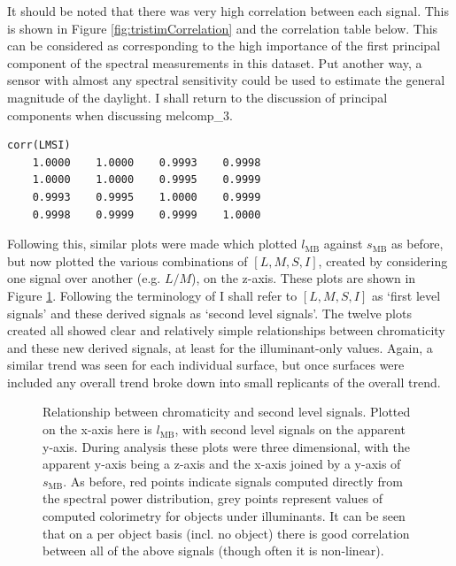 It should be noted that there was very high correlation between each signal. This is shown in Figure \ref{fig:tristimCorrelation} and the correlation table below. This can be considered as corresponding to the high importance of the first principal component of the spectral measurements in this dataset. Put another way, a sensor with almost any spectral sensitivity could be used to estimate the general magnitude of the daylight. I shall return to the discussion of principal components when discussing melcomp\_3.

\begin{minipage}{\linewidth}
\begin{lstlisting}
corr(LMSI)
    1.0000    1.0000    0.9993    0.9998
    1.0000    1.0000    0.9995    0.9999
    0.9993    0.9995    1.0000    0.9999
    0.9998    0.9999    0.9999    1.0000
\end{lstlisting}
\end{minipage}

\bigskip

Following this, similar plots were made which plotted $l_{\text{MB}}$ against $s_{\text{MB}}$ as before, but now plotted the various combinations of $[L,M,S,I]$, created by considering one signal over another (e.g. $L/M$), on the z-axis. These plots are shown in Figure \ref{fig:allComboSignals}. Following the terminology of \citet{barrionuevo_contributions_2014} I shall refer to $[L,M,S,I]$ as `first level signals' and these derived signals as `second level signals'. The twelve plots created all showed clear and relatively simple relationships between chromaticity and these new derived signals, at least for the illuminant-only values. Again, a similar trend was seen for each individual surface, but once surfaces were included any overall trend broke down into small replicants of the overall trend.

\clearpage

\begin{figure}[p]
    \caption{Relationship between chromaticity and second level signals. Plotted on the x-axis here is $l_{\text{MB}}$, with second level signals on the apparent y-axis. During analysis these plots were three dimensional, with the apparent y-axis being a z-axis and the x-axis joined by a y-axis of $s_{\text{MB}}$. As before, red points indicate signals computed directly from the spectral power distribution, grey points represent values of computed colorimetry for objects under illuminants. It can be seen that on a per object basis (incl. no object) there is good correlation between all of the above signals (though often it is non-linear).}
    \label{fig:allComboSignals}
\end{figure} 
\clearpage


